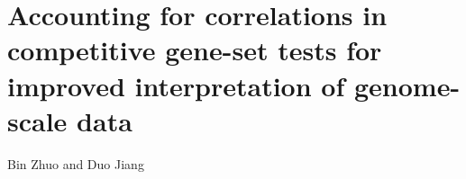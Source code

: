 \section{Accounting for correlations in competitive gene-set
	tests for improved interpretation of genome-scale data}\label{chap3}

\vspace*{5cm}
\begin{centering}
	{\normalsize Bin Zhuo and Duo Jiang}\\[.04\textheight]
\end{centering}	
\vspace*{5cm}

\newpage


	\begin{abstract}
	Competitive gene-set analysis is a widely used tool for interpreting high-throughput biological 
	data, such as gene expression and proteomics data. It aims at testing a known category of genes 
	for enriched association signals in a list of genes inferred from genome-wide data. Most 
	conventional enrichment testing methods ignore or do not properly account for the widespread 
	correlations among genes, which, as we show, can result in mis-calibrated type I error rates 
	and/or power loss. We propose a new framework, \OurMethod, for gene-set test based on a mixed 
	effects quasi-likelihood model, where the data are not required to be Gaussian. Our method 
	effectively adjusts for completely unknown,	unstructured correlations among genes. It uses a 
	score test approach and allows for analytical assessment of $p$-values. Compared to existing 
	methods such as GSEA and CAMERA, our method enjoys robust and substantially improved control 
	over type I error and maintains good power in a variety of correlation structure and 
	association settings. We also present two real data analyses to illustrate our approach.
	\end{abstract}
	
	

